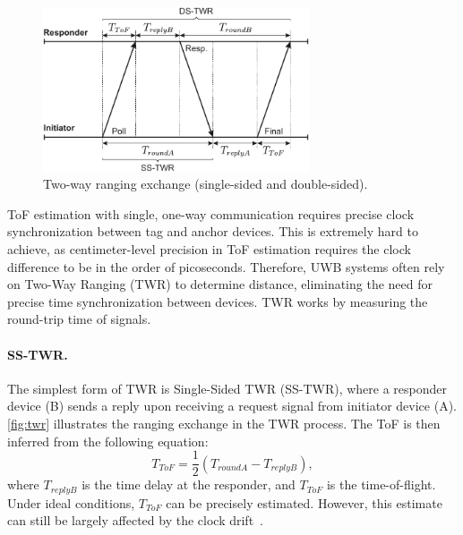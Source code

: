 \begin{figure}[tbh]
\includegraphics[width=0.7\textwidth]{Figures/theoretical_background/twr.pdf}
\centering
\caption[Two-way ranging exchange.]{Two-way ranging exchange (single-sided and double-sided).}
\label{fig:twr}
\end{figure}

ToF estimation with single, one-way communication requires precise clock synchronization between tag and anchor devices. This is extremely hard to achieve, as centimeter-level precision in ToF estimation requires the clock difference to be in the order of picoseconds. Therefore, UWB systems often rely on Two-Way Ranging (TWR) to determine distance, eliminating the need for precise time synchronization between devices. TWR works by measuring the round-trip time of signals.

\paragraph{SS-TWR.}
The simplest form of TWR is Single-Sided TWR (SS-TWR), where a responder device (B) sends a reply upon receiving a request signal from initiator device (A). \autoref{fig:twr} illustrates the ranging exchange in the TWR process. The ToF is then inferred from the following equation:
\begin{equation}\label{tof-ss}
T_{ToF} = \frac{1}{2} (T_{roundA} - T_{replyB}),
\end{equation}
where $T_{replyB}$ is the time delay at the responder, and $T_{ToF}$ is the time-of-flight. Under ideal conditions, $T_{ToF}$ can be precisely estimated. However, this estimate can still be largely affected by the clock drift~\cite{neirynck2016alternative}.

